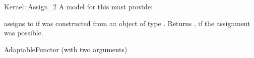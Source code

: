 \begin{ccRefFunctionObjectConcept}{Kernel::Assign_2}
A model for this must provide:


{assigns  to  if 
was constructed from an object of type .
Returns , if the assignment was possible.}

\ccRefines
AdaptableFunctor (with two arguments)

\ccSeeAlso
{}\\
  \\
 \\
  \\

\end{ccRefFunctionObjectConcept}
